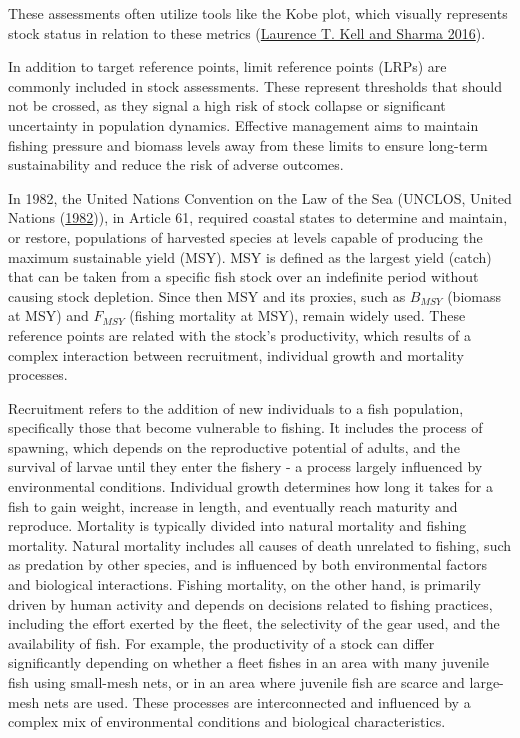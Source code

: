 \documentclass[
]{book}
\begin{document}
These assessments often utilize tools like the Kobe plot, which visually represents stock status in relation to these metrics (\protect\hyperlink{ref-kell2016quantification}{Laurence T. Kell and Sharma 2016}).

In addition to target reference points, limit reference points (LRPs) are commonly included in stock assessments. These represent thresholds that should not be crossed, as they signal a high risk of stock collapse or significant uncertainty in population dynamics. Effective management aims to maintain fishing pressure and biomass levels away from these limits to ensure long-term sustainability and reduce the risk of adverse outcomes.

In 1982, the United Nations Convention on the Law of the Sea (UNCLOS, United Nations (\protect\hyperlink{ref-unclos1982}{1982})), in Article 61, required coastal states to determine and maintain, or restore, populations of harvested species at levels capable of producing the maximum sustainable yield (MSY). MSY is defined as the largest yield (catch) that can be taken from a specific fish stock over an indefinite period without causing stock depletion. Since then MSY and its proxies, such as \(B_{MSY}\) (biomass at MSY) and \(F_{MSY}\) (fishing mortality at MSY), remain widely used. These reference points are related with the stock's productivity, which results of a complex interaction between recruitment, individual growth and mortality processes.

Recruitment refers to the addition of new individuals to a fish population, specifically those that become vulnerable to fishing. It includes the process of spawning, which depends on the reproductive potential of adults, and the survival of larvae until they enter the fishery - a process largely influenced by environmental conditions. Individual growth determines how long it takes for a fish to gain weight, increase in length, and eventually reach maturity and reproduce. Mortality is typically divided into natural mortality and fishing mortality. Natural mortality includes all causes of death unrelated to fishing, such as predation by other species, and is influenced by both environmental factors and biological interactions. Fishing mortality, on the other hand, is primarily driven by human activity and depends on decisions related to fishing practices, including the effort exerted by the fleet, the selectivity of the gear used, and the availability of fish. For example, the productivity of a stock can differ significantly depending on whether a fleet fishes in an area with many juvenile fish using small-mesh nets, or in an area where juvenile fish are scarce and large-mesh nets are used. These processes are interconnected and influenced by a complex mix of environmental conditions and biological characteristics.
\end{document}

